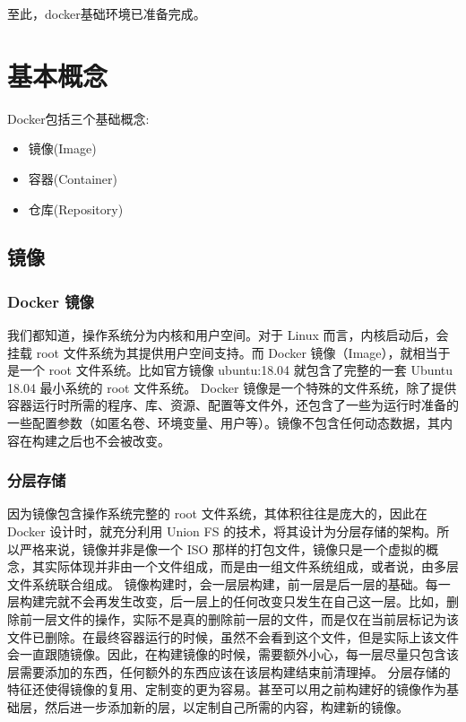 \documentclass[letterpaper,10pt,english]{sphinxmanual}
\begin{document}
至此，docker基础环境已准备完成。


\chapter{基本概念}
\label{\detokenize{docker/basic_concept:id1}}\label{\detokenize{docker/basic_concept::doc}}
Docker包括三个基础概念:
\begin{itemize}
\item {} 
镜像(Image)

\item {} 
容器(Container)

\item {} 
仓库(Repository)

\end{itemize}


\section{镜像}
\label{\detokenize{docker/basic_concept:id2}}

\subsection{Docker 镜像}
\label{\detokenize{docker/basic_concept:docker}}
我们都知道，操作系统分为内核和用户空间。对于 Linux 而言，内核启动后，会挂载 root 文件系统为其提供用户空间支持。而 Docker 镜像（Image），就相当于是一个 root 文件系统。比如官方镜像 ubuntu:18.04 就包含了完整的一套 Ubuntu 18.04 最小系统的 root 文件系统。
Docker 镜像是一个特殊的文件系统，除了提供容器运行时所需的程序、库、资源、配置等文件外，还包含了一些为运行时准备的一些配置参数（如匿名卷、环境变量、用户等）。镜像不包含任何动态数据，其内容在构建之后也不会被改变。


\subsection{分层存储}
\label{\detokenize{docker/basic_concept:id3}}
因为镜像包含操作系统完整的 root 文件系统，其体积往往是庞大的，因此在 Docker 设计时，就充分利用 Union FS 的技术，将其设计为分层存储的架构。所以严格来说，镜像并非是像一个 ISO 那样的打包文件，镜像只是一个虚拟的概念，其实际体现并非由一个文件组成，而是由一组文件系统组成，或者说，由多层文件系统联合组成。
镜像构建时，会一层层构建，前一层是后一层的基础。每一层构建完就不会再发生改变，后一层上的任何改变只发生在自己这一层。比如，删除前一层文件的操作，实际不是真的删除前一层的文件，而是仅在当前层标记为该文件已删除。在最终容器运行的时候，虽然不会看到这个文件，但是实际上该文件会一直跟随镜像。因此，在构建镜像的时候，需要额外小心，每一层尽量只包含该层需要添加的东西，任何额外的东西应该在该层构建结束前清理掉。
分层存储的特征还使得镜像的复用、定制变的更为容易。甚至可以用之前构建好的镜像作为基础层，然后进一步添加新的层，以定制自己所需的内容，构建新的镜像。
\end{document}
